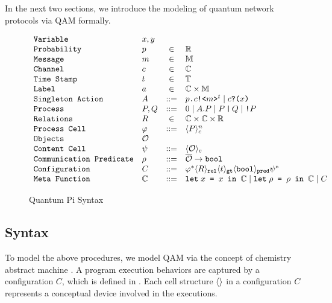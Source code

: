 In the next two sections, we introduce the modeling of quantum network protocols via QAM formally.

\begin{figure}[t]
{\small
  \[\begin{array}{llcl} 
      \texttt{Variable} & x,y \\
      \texttt{Probability} & p &\in &\mathbb{R}\\
      \texttt{Message} & m &\in& \mathbb{M}\\
    \texttt{Channel} & c &\in& \mathbb{C}\\
    \texttt{Time Stamp} & t &\in& \mathbb{T}\\
    \texttt{Label} & a &\in& \mathbb{C} \times \mathbb{M}\\
      \texttt{Singleton Action} & A & ::= & \qsend{p}{c}{m}^t \mid \qrev{c}{x} \\
      \texttt{Process} & P,Q & ::= & 0 \mid A.P \mid \parl{P}{Q} \mid \comp{P} \\
      \texttt{Relations} & R & \in & \mathbb{C} \times \mathbb{C} \times \mathbb{R} \\
      \texttt{Process Cell} & \varphi & ::= & \pcell{P}{n}{c} \\
      \texttt{Objects} & \Os \\
      \texttt{Content Cell} & \psi & ::= & \qcell{\Os}{c} \\
      \texttt{Communication Predicate} & \rho & ::= & \overline{\Os} \to \cn{bool}\\
      \texttt{Configuration} & C & ::= & \varphi^* \qcell{R}{\cn{rel}} \qcell{t}{\cn{gt}}\qcell{\cn{bool}}{\cn{pred}} \psi^* \\
      \texttt{Meta Function} & \Cs & ::= & \leta{x}{\psi}{\Cs}\mid\leta{\rho}{\Fs(\overline{Os})}{\Cs} \mid C\\
    \end{array}
  \]
}
\caption{Quantum Pi Syntax}
  \label{fig:q-pi-syntax}
\end{figure}


\subsection{Syntax} \label{sec:qamsyntax}

To model the above procedures, we model QAM via the concept of chemistry abstract machine \cite{BERRY1992217}.
A program execution behaviors are captured by a configuration $C$, which is defined in .
Each cell structure $\ccell{}$ in a configuration $C$ represents a conceptual device involved in the executions.

